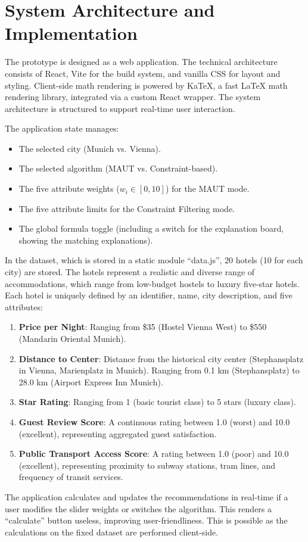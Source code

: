 \documentclass[acmlarge]{acmart}
\begin{document}
\section{System Architecture and Implementation}\label{sec:system_architecture_and_implementation}
The prototype is designed as a web application. The technical architecture consists of React, Vite for the build system, and vanilla CSS for layout and styling. Client-side math rendering is powered by KaTeX, a fast LaTeX math rendering library, integrated via a custom React wrapper. The system architecture is structured to support real-time user interaction.

The application state manages:
\begin{itemize}
  \item The selected city (Munich vs. Vienna).
  \item The selected algorithm (MAUT vs. Constraint-based).
  \item The five attribute weights ($w_i \in [0, 10]$) for the MAUT mode.
  \item The five attribute limits for the Constraint Filtering mode.
  \item The global formula toggle (including a switch for the explanation board, showing the matching explanations).
\end{itemize}

In the dataset, which is stored in a static module ``data.js'', 20 hotels (10 for each city) are stored. The hotels represent a realistic and diverse range of accommodations, which range from low-budget hostels to luxury five-star hotels. Each hotel is uniquely defined by an identifier, name, city description, and five attributes:
\begin{enumerate}
  \item \textbf{Price per Night}: Ranging from \$35 (Hostel Vienna West) to \$550 (Mandarin Oriental Munich).
  \item \textbf{Distance to Center}: Distance from the historical city center (Stephansplatz in Vienna, Marienplatz in Munich). Ranging from 0.1 km (Stephansplatz) to 28.0 km (Airport Express Inn Munich).
  \item \textbf{Star Rating}: Ranging from 1 (basic tourist class) to 5 stars (luxury class).
  \item \textbf{Guest Review Score}: A continuous rating between 1.0 (worst) and 10.0 (excellent), representing aggregated guest satisfaction.
  \item \textbf{Public Transport Access Score}: A rating between 1.0 (poor) and 10.0 (excellent), representing proximity to subway stations, tram lines, and frequency of transit services.
\end{enumerate}
The application calculates and updates the recommendations in real-time if a user modifies the slider weights or switches the algorithm. This renders a ``calculate'' button useless, improving user-friendliness. This is possible as the calculations on the fixed dataset are performed client-side.
\end{document}
